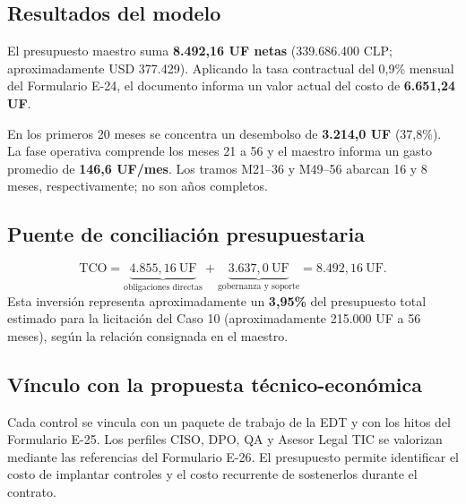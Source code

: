 \subsection{Resultados del modelo}
El presupuesto maestro suma \textbf{8.492,16 UF netas} (339.686.400 CLP; aproximadamente USD 377.429). Aplicando la tasa contractual del 0,9\% mensual del Formulario E-24, el documento informa un valor actual del costo de \textbf{6.651,24 UF}.

En los primeros 20 meses se concentra un desembolso de \textbf{3.214,0 UF} (37,8\%). La fase operativa comprende los meses 21 a 56 y el maestro informa un gasto promedio de \textbf{146,6 UF/mes}. Los tramos M21--36 y M49--56 abarcan 16 y 8 meses, respectivamente; no son años completos.

\subsection{Puente de conciliación presupuestaria}
\[
\mathrm{TCO}=\underbrace{4.855,16\ \mathrm{UF}}_{\text{obligaciones directas}}
+\underbrace{3.637,0\ \mathrm{UF}}_{\text{gobernanza y soporte}}
=\boxed{8.492,16\ \mathrm{UF}}.
\]
Esta inversión representa aproximadamente un \textbf{3,95\%} del presupuesto total estimado para la licitación del Caso 10 (aproximadamente 215.000 UF a 56 meses), según la relación consignada en el maestro.

\subsection{Vínculo con la propuesta técnico-económica}
Cada control se vincula con un paquete de trabajo de la EDT y con los hitos del Formulario E-25. Los perfiles CISO, DPO, QA y Asesor Legal TIC se valorizan mediante las referencias del Formulario E-26. El presupuesto permite identificar el costo de implantar controles y el costo recurrente de sostenerlos durante el contrato.

